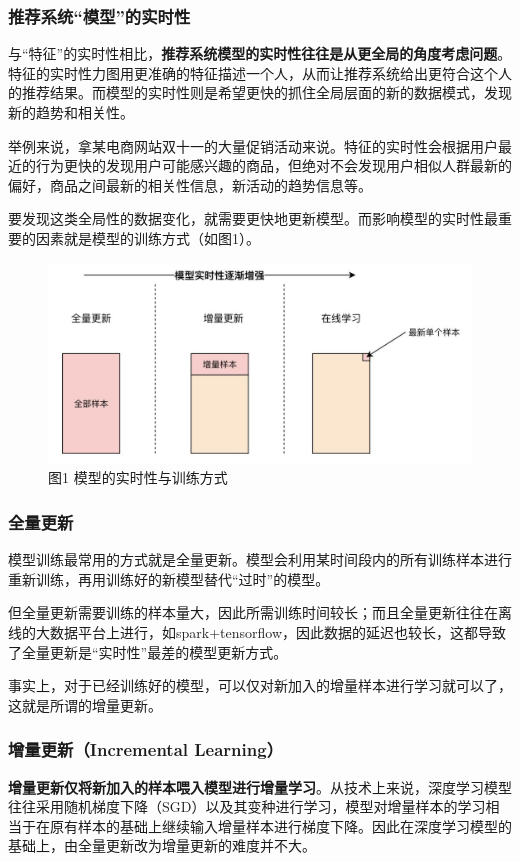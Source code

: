 \documentclass[12pt]{article}
\begin{document}
\subsubsection{推荐系统“模型”的实时性}
与“特征”的实时性相比，\textbf{推荐系统模型的实时性往往是从更全局的角度考虑问题}。特征的实时性力图用更准确的特征描述一个人，从而让推荐系统给出更符合这个人的推荐结果。而模型的实时性则是希望更快的抓住全局层面的新的数据模式，发现新的趋势和相关性。

\begin{framed}
举例来说，拿某电商网站双十一的大量促销活动来说。特征的实时性会根据用户最近的行为更快的发现用户可能感兴趣的商品，但绝对不会发现用户相似人群最新的偏好，商品之间最新的相关性信息，新活动的趋势信息等。
\end{framed}

要发现这类全局性的数据变化，就需要更快地更新模型。而影响模型的实时性最重要的因素就是模型的训练方式（如图1）。
\begin{figure}[H]
    \centering
    \includegraphics[width=.8\textwidth]{fig/Model_Time_Delay_And_Training_Method.png}
    \caption*{图1 模型的实时性与训练方式}
\end{figure}

\subsubsection{全量更新}
模型训练最常用的方式就是全量更新。模型会利用某时间段内的所有训练样本进行重新训练，再用训练好的新模型替代“过时”的模型。

但全量更新需要训练的样本量大，因此所需训练时间较长；而且全量更新往往在离线的大数据平台上进行，如spark+tensorflow，因此数据的延迟也较长，这都导致了全量更新是“实时性”最差的模型更新方式。

事实上，对于已经训练好的模型，可以仅对新加入的增量样本进行学习就可以了，这就是所谓的增量更新。

\subsubsection{增量更新（Incremental Learning）}
\textbf{增量更新仅将新加入的样本喂入模型进行增量学习}。从技术上来说，深度学习模型往往采用随机梯度下降（SGD）以及其变种进行学习，模型对增量样本的学习相当于在原有样本的基础上继续输入增量样本进行梯度下降。因此在深度学习模型的基础上，由全量更新改为增量更新的难度并不大。
\end{document}
